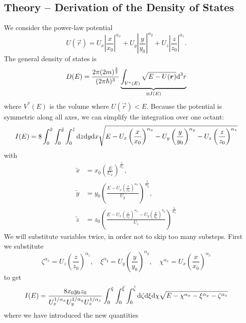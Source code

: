 \subsection{Theory -- Derivation of the Density of States}
\label{sec:appendix_dos}
We consider the power-law potential
\[
    U(\vec{r}) = U_x \left| \frac{x}{x_0} \right|^{\alpha_x} + U_y \left| \frac{y}{y_0} \right|^{\alpha_y} + U_z \left| \frac{z}{z_0} \right|^{\alpha_z}.
\]
The general density of states is \cite{PhysRevA.35.4354}
\begin{equation*}
    D(E) = \frac{2\pi(2m)^\frac{3}{2}}{(2\pi\hbar)^3} \underbrace{\int_{V^*(E)} \sqrt{E - U(\boldsymbol{r})}\text{d}^{3}r}_{\equiv I(E)}
\end{equation*}
where $V^*(E)$ is the volume where $U(\vec{r}) < E$. Because the potential is symmetric along all axes, we can simplify the integration over one octant:
\begin{equation*}
    I(E) = 8\int_0^{\tilde{x}} \int_0^{\tilde{y}} \int_0^{\tilde{z}} \text{d}z \text{d}y \text{d}x \sqrt{E - U_x \left(\frac{x}{x_0}\right)^{\alpha_x} - U_y \left(\frac{y}{y_0}\right)^{\alpha_y} - U_z \left(\frac{z}{z_0}\right)^{\alpha_z}}
\end{equation*}
with
\begin{align*}
    \tilde{x} &= x_0 \left(\frac{E}{U_x}\right)^{\frac{1}{\alpha_x}}, \\ 
    \tilde{y} &= y_0 \left(\frac{E - U_x\left(\frac{x}{x_0}\right)^{\alpha_x}}{U_y}\right)^{\frac{1}{\alpha_y}}, \\ 
    \tilde{z} &= z_0 \left(\frac{E - U_x\left(\frac{x}{x_0}\right)^{\alpha_x} - U_y\left(\frac{y}{y_0}\right)^{\alpha_y} }{U_z}\right)^{\frac{1}{\alpha_z}} 
\end{align*}
We will substitute variables twice, in order not to skip too many substeps. First we substitute
\begin{equation*}
    \zeta^{\alpha_x} = U_z \left(\frac{z}{z_0}\right)^{\alpha_z}, \quad \xi^{\alpha_y} = U_y \left(\frac{y}{y_0}\right)^{\alpha_y}, \quad
    \chi^{\alpha_x} = U_x \left(\frac{x}{x_0}\right)^{\alpha_x}
\end{equation*}
to get
\begin{equation*}
    I(E) = \frac{8 x_0 y_0 z_0}{U_x^{1/\alpha_x} U_y^{1/\alpha_y} U_z^{1/\alpha_z}} \int_0^{\tilde{\chi}} \int_0^{\tilde{\xi}} \int_0^{\tilde{\zeta}} \text{d}\zeta \text{d}\xi \text{d}\chi \sqrt{E - \chi^{\alpha_x} - \xi^{\alpha_y} - \zeta^{\alpha_z}}
\end{equation*}
where we have introduced the new quantities

